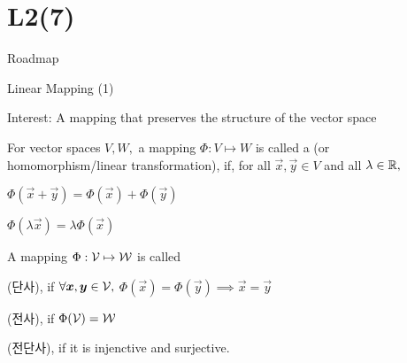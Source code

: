 \documentclass[fleqn,aspectratio=169]{beamer}
\begin{document}
\section{L2(7)}
\begin{frame}{Roadmap}

\plitemsep 0.1in

\bce[(1)] 
\item {}

\item {}

\item {}

\ece
\end{frame}


\begin{frame}{Linear Mapping (1)}

\plitemsep 0.1in

\bci 
\item Interest: A mapping that preserves the structure of the vector space
\item {} For vector spaces $V,W,$ a mapping $\Phi: V \mapsto W$ is called a  (or homomorphism/linear transformation), if, for all $\vec{x}, \vec{y} \in V$ and all $\lambda \in {\mathbb R},$
\bci
\item $\Phi(\vec{x} + \vec{y}) = \Phi(\vec{x}) + \Phi(\vec{y})$
\item $\Phi(\lambda \vec{x}) = \lambda \Phi(\vec{x})$
\eci

\item {} A mapping $\Phi: \mathcal V \mapsto \mathcal W$ is called
\bci
\item {} (단사), if $\forall \bm{x},\bm{y} \in \mathcal V,$ $\Phi(\vec{x}) = \Phi(\vec{y}) \implies \vec{x} = \vec{y}$

\item {} (전사), if $\Phi(\mathcal V) = \mathcal W$

\item {} (전단사), if it is injenctive and surjective. 
\eci

\eci

\end{frame}
\end{document}
